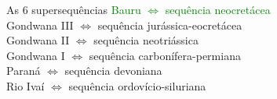 \documentclass[10pt]{beamer} %
\begin{document}
\begin{frame}
\begin{columns}
\begin{column}{0.75\textwidth}
			\begin{block}{As $6$ supersequências}
				\textcolor{green}{Bauru $\Longleftrightarrow$  sequência neocretácea}\\
				Gondwana III $\Longleftrightarrow$ sequência jurássica-eocretácea\\
				Gondwana II $\Longleftrightarrow$ sequência neotriássica \\
				Gondwana I $\Longleftrightarrow$ sequência carbonífera-permiana\\ 
				Paraná $\Longleftrightarrow$ sequência devoniana\\
				Rio Ivaí $\Longleftrightarrow$ sequência ordovício-siluriana\\
				\cite{Vail_1977,assine_1994,milani_orogenias_1998}
			\end{block}
		\end{column}
	\end{columns}
\end{frame}	
\end{document}
